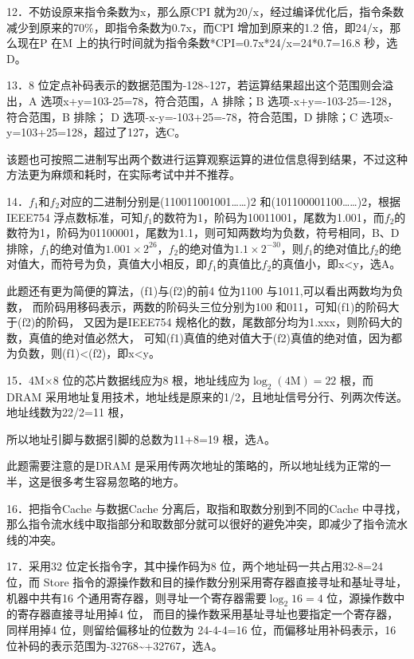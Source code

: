 \documentclass[UTF8,11pt]{ctexart}
\begin{document}
12．不妨设原来指令条数为x，那么原CPI 就为20/x，经过编译优化后，指令条数减少到原来的70\%，即指令条数为0.7x，而CPI 增加到原来的1.2 倍，即24/x，那么现在P 在M 上的执行时间就为指令条数*CPI=0.7x*24/x=24*0.7=16.8 秒，选D。


13．8 位定点补码表示的数据范围为-128\textasciitilde{}127，若运算结果超出这个范围则会溢出，A 选项x+y=103-25=78，符合范围，A 排除；B 选项-x+y=-103-25=-128，符合范围，B 排除； D 选项-x-y=-103+25=-78，符合范围，D 排除；C 选项x-y=103+25=128，超过了127，选C。


该题也可按照二进制写出两个数进行运算观察运算的进位信息得到结果，不过这种方法更为麻烦和耗时，在实际考试中并不推荐。


14．\(\displaystyle f_1\)和\(\displaystyle f_2\)对应的二进制分别是(110011001001……)2 和(101100001100……)2，根据 IEEE754 浮点数标准，可知\(\displaystyle f_1\)的数符为1，阶码为10011001，尾数为1.001，而\(\displaystyle f_2\)的数符为1，阶码为01100001，尾数为1.1，则可知两数均为负数，符号相同，B、D 排除，\(\displaystyle f_1\)的绝对值为\(\displaystyle 1.001\times2^{26}\)，\(\displaystyle f_2\)的绝对值为\(\displaystyle 1.1\times2^{-30}\)，则\(\displaystyle f_1\)的绝对值比\(\displaystyle f_2\)的绝对值大，而符号为负，真值大小相反，即\(\displaystyle f_1\)的真值比\(\displaystyle f_2\)的真值小，即x<y，选A。


此题还有更为简便的算法，(f1)与(f2)的前4 位为1100 与1011,可以看出两数均为负数， 而阶码用移码表示，两数的阶码头三位分别为100 和011，可知(f1)的阶码大于(f2)的阶码， 又因为是IEEE754 规格化的数，尾数部分均为1.xxx，则阶码大的数，真值的绝对值必然大， 可知(f1)真值的绝对值大于(f2)真值的绝对值，因为都为负数，则(f1)<(f2)，即x<y。


15．4M×8 位的芯片数据线应为8 根，地址线应为\(\displaystyle \log_2(4\mathrm M)=22\) 根，而DRAM 采用地址复用技术，地址线是原来的1/2，且地址信号分行、列两次传送。地址线数为22/2=11 根，


所以地址引脚与数据引脚的总数为11+8=19 根，选A。


此题需要注意的是DRAM 是采用传两次地址的策略的，所以地址线为正常的一半，这是很多考生容易忽略的地方。


16．把指令Cache 与数据Cache 分离后，取指和取数分别到不同的Cache 中寻找，那么指令流水线中取指部分和取数部分就可以很好的避免冲突，即减少了指令流水线的冲突。


17．采用32 位定长指令字，其中操作码为8 位，两个地址码一共占用32-8=24 位，而 Store 指令的源操作数和目的操作数分别采用寄存器直接寻址和基址寻址，机器中共有16 个通用寄存器，则寻址一个寄存器需要\(\displaystyle \log_2 16=4\) 位，源操作数中的寄存器直接寻址用掉4 位， 而目的操作数采用基址寻址也要指定一个寄存器，同样用掉4 位，则留给偏移址的位数为 24-4-4=16 位，而偏移址用补码表示，16 位补码的表示范围为-32768\textasciitilde{}+32767，选A。
\end{document}
